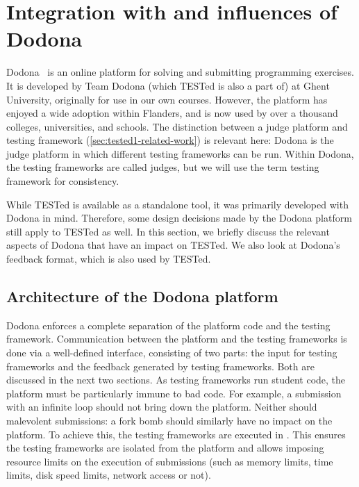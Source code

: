 \documentclass[../main]{subfiles}
\begin{document}
\section{Integration with and influences of Dodona}\label{sec:tested-and-dodona}

Dodona~\autocite{vanpetegemDodonaLearnCode2023} is an online platform for solving and submitting programming exercises.
It is developed by Team Dodona (which TESTed is also a part of) at Ghent University, originally for use in our own courses.
However, the platform has enjoyed a wide adoption within Flanders, and is now used by over a thousand colleges, universities, and schools.
The distinction between a judge platform and testing framework (\cref{sec:tested1-related-work}) is relevant here: Dodona is the judge platform in which different testing frameworks can be run.
Within Dodona, the testing frameworks are called judges, but we will use the term testing framework for consistency.

While TESTed is available as a standalone tool, it was primarily developed with Dodona in mind.
Therefore, some design decisions made by the Dodona platform still apply to TESTed as well.
In this section, we briefly discuss the relevant aspects of Dodona that have an impact on TESTed.
We also look at Dodona's feedback format, which is also used by TESTed.

\subsection{Architecture of the Dodona platform}\label{subsec:dodona-architecture}

Dodona enforces a complete separation of the platform code and the testing framework.
Communication between the platform and the testing frameworks is done via a well-defined interface, consisting of two parts: the input for testing frameworks and the feedback generated by testing frameworks.
Both are discussed in the next two sections.
As testing frameworks run student code, the platform must be particularly immune to bad code.
For example, a submission with an infinite loop should not bring down the platform.
Neither should malevolent submissions: a fork bomb should similarly have no impact on the platform.
To achieve this, the testing frameworks are executed in .
This ensures the testing frameworks are isolated from the platform and allows imposing resource limits on the execution of submissions (such as memory limits, time limits, disk speed limits, network access or not).
\end{document}
